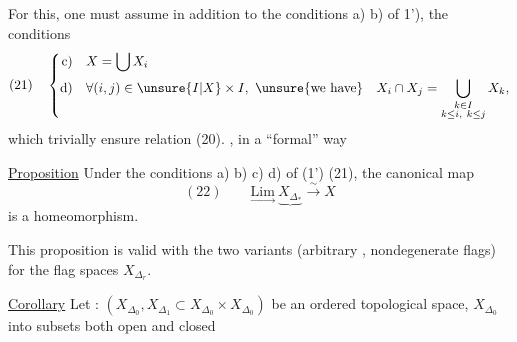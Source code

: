 For this, one must assume in addition to the
conditions a) b) of 1'), the conditions
\[
(21)\quad\left\{\begin{aligned}
\text{c)}\quad&X=\bigcup X_i\\
\text{d)}\quad&\forall(i,j)\in\unsure{I|X}\times I,\ \text{\unsure{we have}}\quad
X_i\cap X_j=\bigcup_{\substack{k\in I\\k\leq i,\ k\leq j}}X_k,
\end{aligned}\right.
\]
which trivially ensure relation (20).
, in a  ``formal'' way \unsure{:|;}

\uline{Proposition} Under the conditions a) b) c) d)
of (1') (21), the canonical map
\[
(22)\qquad\underset{\longrightarrow}{\mathrm{Lim}}\ \underbrace{X_{\Delta_*}}\xrightarrow{\sim}X
\]
is a homeomorphism.

This proposition is valid with the
two variants (arbitrary , nondegenerate
flags) for the
flag spaces $X_{\Delta_r}$.

\uline{Corollary} Let : $(X_{\Delta_0},X_{\Delta_1}\subset X_{\Delta_0}\times X_{\Delta_0})$
be an ordered topological space, 
  $X_{\Delta_0}$ into subsets both open and closed
